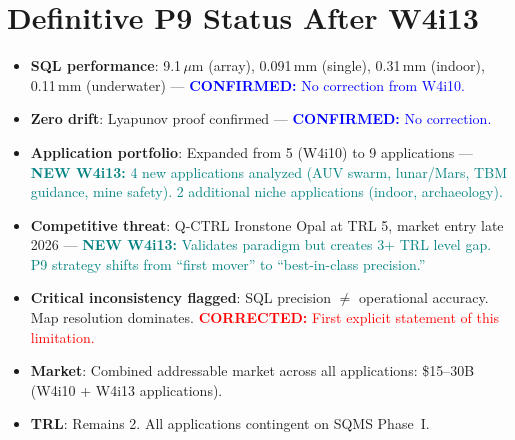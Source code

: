 \documentclass[11pt]{article}
\theoremstyle{definition}
\theoremstyle{remark}
\newcommand{\confirmed}[1]{\textcolor{blue}{\textbf{CONFIRMED:} #1}}
\newcommand{\corrected}[1]{\textcolor{red}{\textbf{CORRECTED:} #1}}
\newcommand{\newfinding}[1]{\textcolor{teal}{\textbf{NEW W4i13:} #1}}
\begin{document}
\section{Definitive P9 Status After W4i13}
\label{sec:status-w4i13}

\begin{tcolorbox}[colback=green!5!white, colframe=green!40!black,
  title=\textbf{P9 Status: ALIVE --- Nearest Commercial Opportunity (Confirmed, Widened)}]
\begin{itemize}[nosep]
\item \textbf{SQL performance}: 9.1\,$\mu$m (array), 0.091\,mm (single),
  0.31\,mm (indoor), 0.11\,mm (underwater) ---
  \confirmed{No correction from W4i10.}
\item \textbf{Zero drift}: Lyapunov proof confirmed ---
  \confirmed{No correction.}
\item \textbf{Application portfolio}: Expanded from 5 (W4i10) to 9
  applications --- \newfinding{4 new applications analyzed (AUV swarm,
  lunar/Mars, TBM guidance, mine safety). 2 additional niche
  applications (indoor, archaeology).}
\item \textbf{Competitive threat}: Q-CTRL Ironstone Opal at TRL 5,
  market entry late 2026 ---
  \newfinding{Validates paradigm but creates 3+ TRL level gap.
  P9 strategy shifts from ``first mover'' to ``best-in-class precision.''}
\item \textbf{Critical inconsistency flagged}: SQL precision $\neq$
  operational accuracy. Map resolution dominates.
  \corrected{First explicit statement of this limitation.}
\item \textbf{Market}: Combined addressable market across all
  applications: \$15--30B (W4i10 + W4i13 applications).
\item \textbf{TRL}: Remains 2. All applications contingent on SQMS
  Phase~I.
\end{itemize}
\end{tcolorbox}
\end{document}
